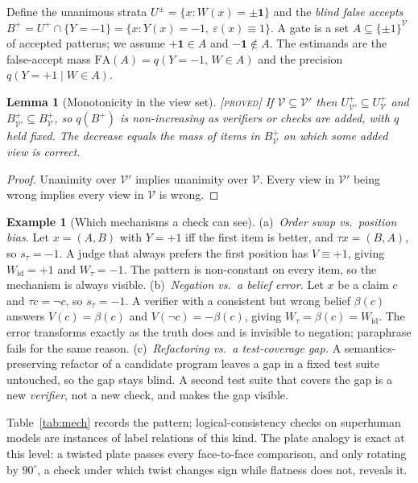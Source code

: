 \documentclass[11pt]{article}
\newtheorem{lemma}{Lemma}
\theoremstyle{definition}
\newtheorem{example}{Example}
\theoremstyle{remark}
\newcommand{\status}[1]{\hfill{\normalfont\small\textsc{[#1]}}}
\newcommand{\cV}{\mathcal{V}}
\newcommand{\one}{\mathbf{1}}
\newcommand{\Up}{U^{+}}
\begin{document}
Define the unanimous strata $U^{\pm}=\{x:W(x)=\pm\one\}$ and the \emph{blind false accepts} $B^+=\Up\cap\{Y=-1\}=\{x: Y(x)=-1,\ \varepsilon(x)\equiv 1\}$. A gate is a set $A\subseteq\{\pm1\}^{\cV}$ of accepted patterns; we assume $+\one\in A$ and $-\one\notin A$. The estimands are the false-accept mass $\mathrm{FA}(A)=q(Y=-1,\,W\in A)$ and the precision $q(Y=+1\mid W\in A)$.

\begin{lemma}[Monotonicity in the view set]\label{lem:mono}\status{proved}
If $\cV\subseteq\cV'$ then $U^+_{\cV'}\subseteq U^+_{\cV}$ and $B^+_{\cV'}\subseteq B^+_{\cV}$, so $q(B^+)$ is non-increasing as verifiers or checks are added, with $q$ held fixed. The decrease equals the mass of items in $B^+_{\cV}$ on which some added view is correct.
\end{lemma}
\begin{proof}
Unanimity over $\cV'$ implies unanimity over $\cV$. Every view in $\cV'$ being wrong implies every view in $\cV$ is wrong.
\end{proof}

\begin{example}[Which mechanisms a check can see]
(a)~\emph{Order swap vs.\ position bias.} Let $x=(A,B)$ with $Y=+1$ iff the first item is better, and $\tau x=(B,A)$, so $s_\tau=-1$. A judge that always prefers the first position has $V\equiv+1$, giving $W_{\mathrm{id}}=+1$ and $W_\tau=-1$. The pattern is non-constant on every item, so the mechanism is always visible.
(b)~\emph{Negation vs.\ a belief error.} Let $x$ be a claim $c$ and $\tau c=\neg c$, so $s_\tau=-1$. A verifier with a consistent but wrong belief $\beta(c)$ answers $V(c)=\beta(c)$ and $V(\neg c)=-\beta(c)$, giving $W_\tau=\beta(c)=W_{\mathrm{id}}$. The error transforms exactly as the truth does and is invisible to negation; paraphrase fails for the same reason.
(c)~\emph{Refactoring vs.\ a test-coverage gap.} A semantics-preserving refactor of a candidate program leaves a gap in a fixed test suite untouched, so the gap stays blind. A second test suite that covers the gap is a new \emph{verifier}, not a new check, and makes the gap visible.
\end{example}

Table~\ref{tab:mech} records the pattern; logical-consistency checks on superhuman models \cite{fluri2023} are instances of label relations of this kind. The plate analogy is exact at this level: a twisted plate passes every face-to-face comparison, and only rotating by $90^\circ$, a check under which twist changes sign while flatness does not, reveals it.
\end{document}
